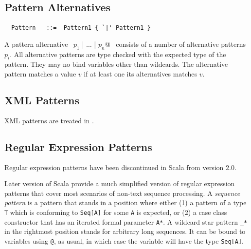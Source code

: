 \subsection{Pattern Alternatives}

\syntax\begin{lstlisting}
  Pattern   ::=  Pattern1 { `|' Pattern1 }
\end{lstlisting}

A pattern alternative ~\lstinline@$p_1$ | $\ldots$ | $p_n$@~
consists of a number of alternative patterns $p_i$. All alternative
patterns are type checked with the expected type of the pattern. They
may no bind variables other than wildcards. The alternative pattern 
matches a value $v$ if at least one its alternatives matches $v$.

\subsection{XML Patterns}

XML patterns are treated in .

\subsection{Regular Expression Patterns}\label{sec:reg-pats}

Regular expression patterns have been discontinued in Scala from version 2.0.

Later version of Scala provide a much simplified version of regular
expression patterns that cover most scenarios of non-text sequence
processing.  A {\em sequence pattern} is a pattern that stands in a
position where either (1) a pattern of a type \lstinline+T+ which is
conforming to
\lstinline+Seq[A]+ for some \lstinline+A+ is expected, or (2) a case
class constructor that has an iterated formal parameter
\lstinline+A*+.  A wildcard star pattern \lstinline+_*+ in the
rightmost position stands for arbitrary long sequences. It can be
bound to variables using \lstinline+@+, as usual, in which case the variable will have the
type \lstinline+Seq[A]+.


